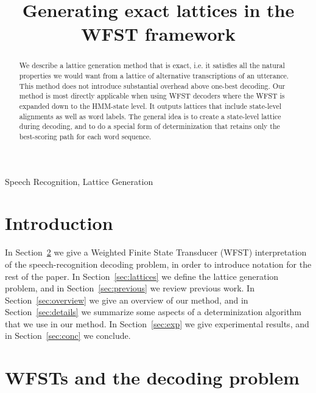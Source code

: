 \documentclass{article}
\title{Generating exact lattices in the WFST framework}
\begin{document}
\ninept  
%
\maketitle
%

\begin{abstract}
We describe a lattice generation method that is exact, i.e. it satisfies all the 
natural properties we would want from a lattice of alternative transcriptions of
an utterance.  This method does not introduce substantial overhead above one-best decoding.  Our method is
most directly applicable when using WFST decoders where the WFST is
expanded down to the HMM-state level.  It outputs
lattices that include state-level alignments as well as word labels.
The general idea is to create a state-level lattice during decoding, and to do
a special form of determinization that retains only the best-scoring path
for each word sequence.
\end{abstract}

\begin{keywords}
  Speech Recognition, Lattice Generation
\end{keywords}

\section{Introduction}

In Section~\ref{sec:wfst} we give a Weighted Finite State Transducer
(WFST) interpretation of the speech-recognition decoding problem, in order
to introduce notation for the rest of the paper.  In Section~\ref{sec:lattices}
we define the lattice generation problem, and in Section~\ref{sec:previous}
we review previous work.
In Section~\ref{sec:overview} we give an overview of our method,
and in Section~\ref{sec:details} we summarize some aspects of a determinization
algorithm that we use in our method.  In Section~\ref{sec:exp} we give
experimental results, and in Section~\ref{sec:conc} we conclude.

\section{WFSTs and the decoding problem}
\label{sec:wfst}
\end{document}
